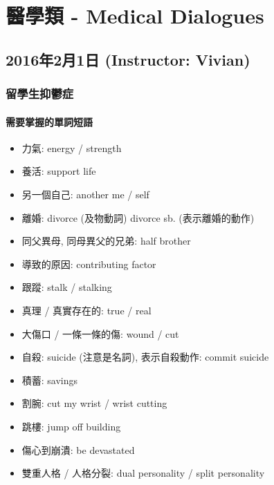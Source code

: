 \chapter{醫學類 - Medical Dialogues}
\section{2016年2月1日 (Instructor: Vivian)}
\subsection{留學生抑鬱症}
\subsubsection*{需要掌握的單詞短語}
\begin{multicols}{2}
\begin{itemize}
  \itemsep0em
  \item 力氣: energy / strength
  \item 養活: support life
  \item 另一個自己: another me / self
  \item 離婚: divorce (及物動詞) divorce sb. (表示離婚的動作)
  \item 同父異母, 同母異父的兄弟: half brother
  \item 導致的原因: contributing factor
  \item 跟蹤: stalk / stalking
  \item 真理 / 真實存在的: true / real
  \item 大傷口 / 一條一條的傷: wound / cut
  \item 自殺: suicide (注意是名詞), 表示自殺動作: commit suicide
  \item 積蓄: savings
  \item 割腕: cut my wrist / wrist cutting
  \item 跳樓: jump off  building
  \item 傷心到崩潰: be devastated
  \item 雙重人格 / 人格分裂: dual personality / split personality
\end{itemize}
\end{multicols}

